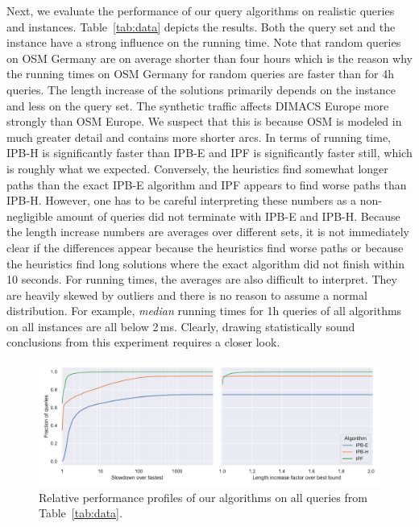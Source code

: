 \documentclass[a4paper,UKenglish,cleveref, autoref, thm-restate]{lipics-v2021}
\begin{document}
Next, we evaluate the performance of our query algorithms on realistic queries and instances.
Table~\ref{tab:data} depicts the results.
Both the query set and the instance have a strong influence on the running time.
Note that random queries on OSM Germany are on average shorter than four hours which is the reason why the running times on OSM Germany for random queries are faster than for 4h queries.
The length increase of the solutions primarily depends on the instance and less on the query set.
The synthetic traffic affects DIMACS Europe more strongly than OSM Europe.
We suspect that this is because OSM is modeled in much greater detail and contains more shorter arcs. %
In terms of running time, IPB-H is significantly faster than IPB-E and IPF is significantly faster still, which is roughly what we expected.
Conversely, the heuristics find somewhat longer paths than the exact IPB-E algorithm and IPF appears to find worse paths than IPB-H.
However, one has to be careful interpreting these numbers as a non-negligible amount of queries did not terminate with IPB-E and IPB-H.
Because the length increase numbers are averages over different sets, it is not immediately clear if the differences appear because the heuristics find worse paths or because the heuristics find long solutions where the exact algorithm did not finish within 10 seconds.
For running times, the averages are also difficult to interpret.
They are heavily skewed by outliers and there is no reason to assume a normal distribution.
For example, \emph{median} running times for 1h queries of all algorithms on all instances are all below 2\,ms. %
Clearly, drawing statistically sound conclusions from this experiment requires a closer look.

\begin{figure}
\centering
\includegraphics[width=\linewidth]{fig/combined_perf_profile.pdf}
\caption{
Relative performance profiles of our algorithms on all queries from Table~\ref{tab:data}.
}\label{fig:perf_profile}
\end{figure}
\end{document}
